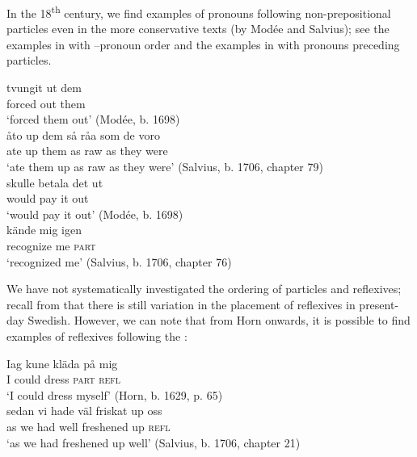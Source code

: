 \documentclass[output=paper]{langscibook}
\begin{document}
In the 18\textsuperscript{th} century, we find examples of pronouns following non-prepositional particles even in the more conservative texts (by Modée and Salvius); see the examples in  with –pronoun order and the examples in  with pronouns preceding particles.


\ea\label{ex:lalu:34}
\ea\label{ex:lalu:34a}
\gll  tvungit   ut   dem\\
   forced   out   them\\
\glt `forced them out’ (Modée, b. 1698)\\

\ex\label{ex:lalu:34b}
\gll  åto  up  dem     så   råa   som  de   voro\\
    ate    up  them    as   raw   as     they   were\\
\glt `ate them up as raw as they were’ (Salvius, b. 1706, chapter 79)\\
\z
\ex\label{ex:lalu:35}
\ea\label{ex:lalu:35a}
\gll  skulle   betala   det   ut\\
    would   pay     it     out\\
\glt `would pay it out’ (Modée, b. 1698)\\

\ex\label{ex:lalu:35b}
\gll  kände     mig   igen \\
   recognize   me   \textsc{part}\\
\glt `recognized me’ (Salvius, b. 1706, chapter 76)\\
\z
\z


We have not systematically investigated the ordering of particles and reflexives; recall from  that there is still variation in the placement of reflexives in present-day Swedish. However, we can note that from Horn onwards, it is possible to find examples of reflexives following the :


\ea\label{ex:lalu:36}
\ea\label{ex:lalu:36a}
\gll  Iag   kune   kläda   på     mig\\
    I        could   dress     \textsc{part}    \textsc{refl} \\
\glt `I could dress myself’ (Horn, b. 1629, p. 65)\\

\ex\label{ex:lalu:36b}
\gll  sedan   vi     hade    väl   friskat     up   oss\\
    as         we    had     well   freshened  up   \textsc{refl}\\
  \glt `as we had freshened up well’ (Salvius, b. 1706, chapter 21)\\
\z
\z
\end{document}
